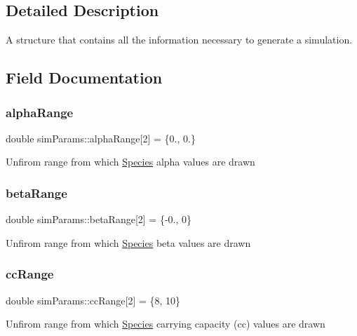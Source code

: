 \subsection{Detailed Description}
A structure that contains all the information necessary to generate a simulation. 

\subsection{Field Documentation}
\mbox{\label{structsimParams_a2674f228bf6b33bf35dc6d1cfb6befba}} 
\subsubsection{\texorpdfstring{alpha\+Range}{alphaRange}}
{\footnotesize\ttfamily double sim\+Params\+::alpha\+Range\mbox{[}2\mbox{]} = \{0., 0.\}}

Unfirom range from which \hyperlink{classSpecies}{Species} alpha values are drawn \mbox{\label{structsimParams_a676b73cd7d60743090c9f2b4c166c083}} 
\subsubsection{\texorpdfstring{beta\+Range}{betaRange}}
{\footnotesize\ttfamily double sim\+Params\+::beta\+Range\mbox{[}2\mbox{]} = \{-\/0., 0\}}

Unfirom range from which \hyperlink{classSpecies}{Species} beta values are drawn \mbox{\label{structsimParams_a730247ea2898e90b85dd99c55d8a18e3}} 
\subsubsection{\texorpdfstring{cc\+Range}{ccRange}}
{\footnotesize\ttfamily double sim\+Params\+::cc\+Range\mbox{[}2\mbox{]} = \{8, 10\}}

Unfirom range from which \hyperlink{classSpecies}{Species} carrying capacity (cc) values are drawn \mbox{\label{structsimParams_a7b06eae32b1691cb52bfc4a7e135f589}} 
